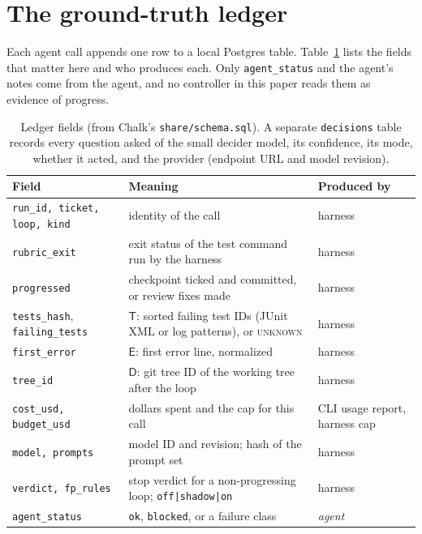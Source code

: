 \documentclass[11pt]{article}
\theoremstyle{remark}
\newcommand{\Tset}{\mathsf{T}}
\newcommand{\Eerr}{\mathsf{E}}
\newcommand{\Dtree}{\mathsf{D}}
\begin{document}
\section{The ground-truth ledger}
\label{sec:ledger}

Each agent call appends one row to a local Postgres table. Table~\ref{tab:ledger} lists the fields that matter here and who produces each. Only \texttt{agent\_status} and the agent's notes come from the agent, and no controller in this paper reads them as evidence of progress.

\begin{table}[t]
\centering\small
\begin{tabularx}{\linewidth}{@{}lXl@{}}
\toprule
Field & Meaning & Produced by \\
\midrule
\texttt{run\_id, ticket, loop, kind} & identity of the call & harness \\
\texttt{rubric\_exit} & exit status of the test command run by the harness & harness \\
\texttt{progressed} & checkpoint ticked and committed, or review fixes made & harness \\
\texttt{tests\_hash}, \texttt{failing\_tests} & $\Tset$: sorted failing test IDs (JUnit XML or log patterns), or \textup{\textsc{unknown}} & harness \\
\texttt{first\_error} & $\Eerr$: first error line, normalized & harness \\
\texttt{tree\_id} & $\Dtree$: git tree ID of the working tree after the loop & harness \\
\texttt{cost\_usd, budget\_usd} & dollars spent and the cap for this call & CLI usage report, harness cap \\
\texttt{model, prompts} & model ID and revision; hash of the prompt set & harness \\
\texttt{verdict, fp\_rules} & stop verdict for a non-progressing loop; \texttt{off|shadow|on} & harness \\
\texttt{agent\_status} & \texttt{ok}, \texttt{blocked}, or a failure class & \emph{agent} \\
\bottomrule
\end{tabularx}
\caption{Ledger fields (from Chalk's \texttt{share/schema.sql}). A separate \texttt{decisions} table records every question asked of the small decider model, its confidence, its mode, whether it acted, and the provider (endpoint URL and model revision).}
\label{tab:ledger}
\end{table}
\end{document}
